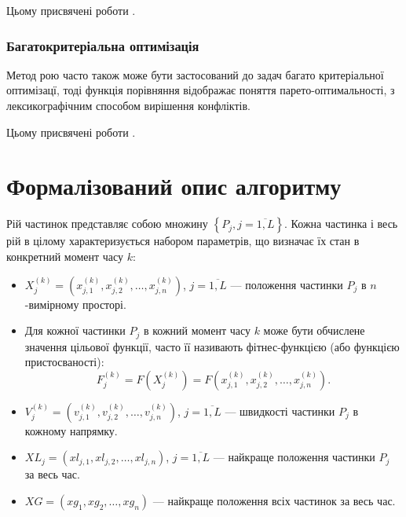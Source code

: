 \documentclass[a4paper, 12pt]{article}
\numberwithin{equation}{section}
\begin{document}
Цьому присвячені роботи \cite{eve09, lk02, xin10, xzy02}.

\subsubsection{Багатокритеріальна оптимізація}

Метод рою часто також може бути застосований до задач багато критеріальної оптимізацї, тоді функція порівняння відображає поняття парето-оптимальності, з лексикографічним способом вирішення конфліктів. \medskip

Цьому присвячені роботи \cite{pv02, cs02, mdh17}.

\section{Формалізований опис алгоритму}

Рій частинок представляє собою множину $\left\{P_j, j = \overline{1,L}\right\}$. Кожна частинка і весь рій в цілому характеризується набором параметрів, що визначає їх стан в конкретний момент часу $k$:

\begin{itemize}
    \item $X_j^{(k)} = \left( x_{j,1}^{(k)}, x_{j, 2}^{(k)}, \ldots, x_{j, n}^{(k)} \right)$, $j = \overline{1,L}$ --- положення частинки $P_j$ в $n$-вимірному просторі.

    \item Для кожної частинки $P_j$ в кожний момент часу $k$ може бути обчислене значення цільової функції, часто її називають фітнес-функцією (або функцією пристосваності): 
	\begin{equation}
	    F_j^{(k)} = F \left( X_j^{(k)} \right) = F \left( x_{j,1}^{(k)}, x_{j, 2}^{(k)}, \ldots, x_{j, n}^{(k)} \right).
	\end{equation}

    \item $V_j^{(k)} = \left( v_{j,1}^{(k)}, v_{j,2}^{(k)}, \ldots, v_{j,n}^{(k)} \right)$, $j = \overline{1,L}$ --- швидкості частинки $P_j$ в кожному напрямку.

    \item $XL_j = \left( xl_{j,1}, xl_{j, 2}, \ldots, xl_{j, n} \right)$, $j = \overline{1,L}$ --- найкраще положення частинки $P_j$ за весь час.

    \item $XG = \left( xg_1, xg_2, \ldots, xg_n \right)$ --- найкраще положення всіх частинок за весь час.
\end{itemize}
\end{document}
